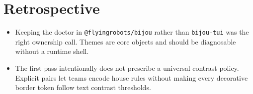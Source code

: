 \section{Retrospective}\label{record-176-retrospective}

\begin{itemize}
\tightlist
\item
  Keeping the doctor in \texttt{@\allowbreak{}f\allowbreak{}l\allowbreak{}y\allowbreak{}i\allowbreak{}n\allowbreak{}g\allowbreak{}r\allowbreak{}o\allowbreak{}b\allowbreak{}o\allowbreak{}t\allowbreak{}s\allowbreak{}/\allowbreak{}b\allowbreak{}i\allowbreak{}j\allowbreak{}o\allowbreak{}u} rather than \texttt{b\allowbreak{}i\allowbreak{}j\allowbreak{}o\allowbreak{}u\allowbreak{}-\allowbreak{}t\allowbreak{}u\allowbreak{}i} was the right ownership call. Themes are core objects and should be diagnosable without a runtime shell.
\item
  The first pass intentionally does not prescribe a universal contrast policy. Explicit pairs let teams encode house rules without making every decorative border token follow text contrast thresholds.
\end{itemize}

